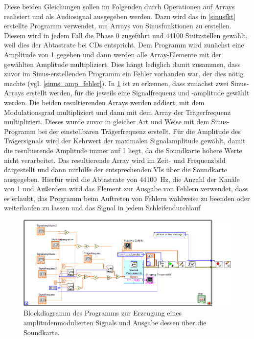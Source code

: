 \documentclass[
a4paper,
12pt,
pagesize,
ngerman
]{scrartcl}
\begin{document}
	Diese beiden Gleichungen sollen im Folgenden durch Operationen auf Arrays realisiert und als Audiosignal ausgegeben werden.	
	Dazu wird das in \cref{sinusfkt} erstellte Programm verwendet, um Arrays von Sinusfunktionen zu erstellen.
	Diesem wird in jedem Fall die Phase 0 zugeführt und 44100 Stützstellen gewählt, weil dies der Abtastrate bei CDs entspricht.
	Dem Programm wird zunächst eine Amplitude von 1 gegeben und dann werden alle Array-Elemente mit der gewählten Amplitude multipliziert.
	Dies hängt lediglich damit zusammen, dass zuvor im Sinus-erstellenden Programm ein Fehler vorhanden war, der dies nötig machte (vgl. \cref{sinus_amp_fehler}).
	In \cref{fig_tag3_am_soundkarte_block} ist zu erkennen, dass zunächst zwei Sinus-Arrays erstellt werden, für die jeweils eine Signalfrequenz und -amplitude gewählt werden.
	Die beiden resultierenden Arrays werden addiert, mit dem Modulationsgrad multipliziert und dann mit dem Array der Trägerfrequenz multipliziert.
	Dieses wurde zuvor in gleicher Art und Weise mit dem Sinus-Programm bei der einstellbaren Trägerfrequenz erstellt.
	Für die Amplitude des Trägersignals wird der Kehrwert der maximalen Signalamplitude gewählt, damit die resultierende Amplitude immer auf 1 liegt, da die Soundkarte höhere Werte nicht verarbeitet.
	Das resultierende Array wird im Zeit- und Frequenzbild dargestellt und dann mithilfe der entsprechenden VIs über die Soundkarte ausgegeben. %
	Hierfür wird die Abtastrate von \SI{44100}{\hertz}, die Anzahl der Kanäle von 1 und %
	Außerdem wird das Element zur Ausgabe von Fehlern verwendet, dass es erlaubt, das Programm beim Auftreten von Fehlern wahlweise zu beenden oder weiterlaufen zu lassen und das Signal in jedem Schleifendurchlauf 
	
	\begin{figure}[H]  
		\includegraphics[width=1\textwidth]{EIRE2018Dateien/Tag3/Soundkarteoutoszi/AMd}
		\centering
		\caption{
			Blockdiagramm des Programms zur Erzeugung eines amplitudenmodulierten Signals und Ausgabe dessen über die Soundkarte.
		}
		\label{fig_tag3_am_soundkarte_block}
		\centering
	\end{figure}
	
\end{document}
